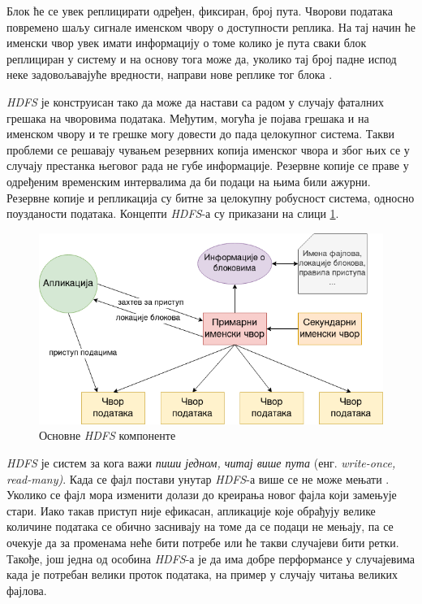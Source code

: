 \documentclass[12pt,oneside]{memoir}
\begin{document}
Блок ће се увек реплицирати одређен, фиксиран, број пута. Чворови података повремено шаљу сигнале именском чвору о доступности реплика. На тај начин ће именски чвор увек имати информацију о томе колико је пута сваки блок реплициран у систему и на основу тога може да, уколико тај број падне испод неке задовољавајуће вредности, направи нове реплике тог блока \cite{hadoop_arch_guide}.

\textit{HDFS} је конструисан тако да може да настави са радом у случају фаталних грешака на чворовима података. Међутим, могућа је појава грешака и на именском чвору и те грешке могу довести до пада целокупног система. Такви проблеми се решавају чувањем резервних копија именског чвора и због њих се у случају престанка његовог рада не губе информације. Резервне копије се праве у одређеним временским интервалима да би подаци на њима били ажурни. Резервне копије и репликација су битне за целокупну робусност система, односно поузданости података. Концепти \textit{HDFS}-а су приказани на слици \ref{fig:hadoop_sistem}.

\begin{figure}[!ht]
  \centering
  \includegraphics[width=1\textwidth]{pictures/hdfs_components_basic.png}
  \caption{Основне \textit{HDFS} компоненте}
  \label{fig:hadoop_sistem}
\end{figure}

\textit{HDFS} је систем за кога важи \textit{пиши једном, читај више пута} (енг. \textit{write-once, read-many)}. Када се фајл постави унутар \textit{HDFS}-а више се не може мењати \cite{hadoop_beginner}. Уколико се фајл мора изменити долази до креирања новог фајла који замењује стари. Иако такав приступ није ефикасан, апликације које обрађују велике количине података се обично заснивају на томе да се подаци не мењају, па се очекује да за променама неће бити потребе или ће такви случајеви бити ретки. Такође, још једна од особина \textit{HDFS}-а је да има добре перформансе у случајевима када је потребан велики проток података, на пример у случају читања великих фајлова.
\end{document}
